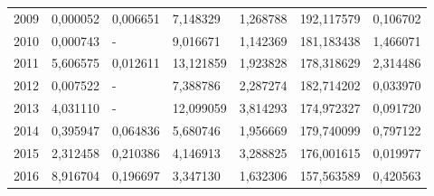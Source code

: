 \begin{table}
\begin{tabular}{p{1cm}p{2cm}p{2cm}p{2cm}p{2cm}p{2cm}p{2cm}}
 2009 &                         0,000052 &        0,006651 &                                     7,148329 &                          1,268788 &                     192,117579 &                         0,106702 \\
 2010 &                         0,000743 &               - &                                     9,016671 &                          1,142369 &                     181,183438 &                         1,466071 \\
 2011 &                         5,606575 &        0,012611 &                                    13,121859 &                          1,923828 &                     178,318629 &                         2,314486 \\
 2012 &                         0,007522 &               - &                                     7,388786 &                          2,287274 &                     182,714202 &                         0,033970 \\
 2013 &                         4,031110 &               - &                                    12,099059 &                          3,814293 &                     174,972327 &                         0,091720 \\
 2014 &                         0,395947 &        0,064836 &                                     5,680746 &                          1,956669 &                     179,740099 &                         0,797122 \\
 2015 &                         2,312458 &        0,210386 &                                     4,146913 &                          3,288825 &                     176,001615 &                         0,019977 \\
 2016 &                         8,916704 &        0,196697 &                                     3,347130 &                          1,632306 &                     157,563589 &                         0,420563 \\
\bottomrule
\end{tabular}
\end{table}
